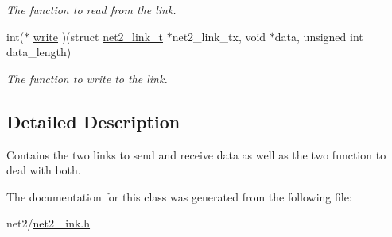 \begin{DoxyCompactItemize}
\begin{DoxyCompactList}\small\item\em The function to read from the link. \end{DoxyCompactList}\item 
\hypertarget{structnet2__link__t_ac1513cd0177b78d51e564224be84ef01}{int($\ast$ \hyperlink{structnet2__link__t_ac1513cd0177b78d51e564224be84ef01}{write} )(struct \hyperlink{structnet2__link__t}{net2\-\_\-link\-\_\-t} $\ast$net2\-\_\-link\-\_\-tx, void $\ast$data, unsigned int data\-\_\-length)}\label{structnet2__link__t_ac1513cd0177b78d51e564224be84ef01}

\begin{DoxyCompactList}\small\item\em The function to write to the link. \end{DoxyCompactList}\end{DoxyCompactItemize}


\subsection{Detailed Description}
Contains the two links to send and receive data as well as the two function to deal with both. 

The documentation for this class was generated from the following file\-:\begin{DoxyCompactItemize}
\item 
net2/\hyperlink{net2__link_8h}{net2\-\_\-link.\-h}\end{DoxyCompactItemize}
